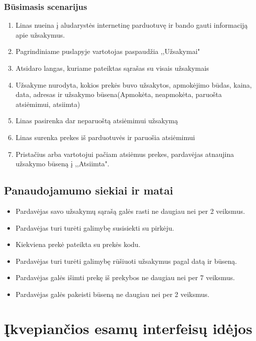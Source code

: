 \documentclass[oneside]{VUMIFPSkursinis}
\begin{document}
		\subsubsection{Būsimasis scenarijus}
				\begin{enumerate}
					\item{Linas nueina į aludarystės internetinę parduotuvę ir bando gauti informaciją apie užsakymus.}
					\item{Pagrindiniame puslapyje vartotojas paspaudžia ,,Užsakymai"}
					\item{Atsidaro langas, kuriame pateiktas sąrašas su visais užsakymais}
					\item{Užsakyme nurodyta, kokios prekės buvo užsakytos, apmokėjimo būdas, kaina, data, adresas ir užsakymo būsena(Apmokėta, neapmokėta, paruošta atsiėmimui, atsiimta)}
					\item{Linas pasirenka dar neparuoštą atsiėmimui užsakymą}
					\item{Linas surenka prekes iš parduotuvės ir paruošia atsiėmimui}
					\item{Pristačius arba vartotojui pačiam atsiėmus prekes, pardavėjas atnaujina užsakymo būseną į ,,Atsiimta".}
					\end{enumerate}
	\subsection{Panaudojamumo siekiai ir matai}
	\begin{itemize}
	\item{Pardavėjas savo užsakymų sąrašą galės rasti ne daugiau nei per 2 veiksmus.}
	\item{Pardavėjas turi turėti galimybę susisiekti su pirkėju.}
	\item{Kiekviena prekė pateikta su prekės kodu.}
	\item{Pardavėjas turi turėti galimybę rūšiuoti užsakymus pagal datą ir būseną.}
	\item{Pardavėjas galės išimti prekę iš prekybos ne daugiau nei per 7 veiksmus.}
	\item{Pardavėjas galės pakeisti būseną ne daugiau nei per 2 veiksmus.}
	\end{itemize}
\section{Įkvepiančios esamų interfeisų idėjos}
\end{document}
